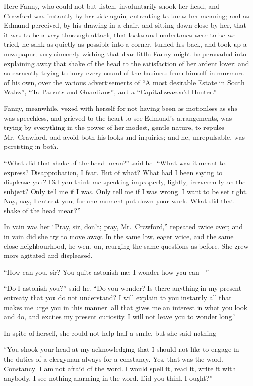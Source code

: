 Here Fanny, who could not but listen, involuntarily shook
her head, and Crawford was instantly by her side again,
entreating to know her meaning; and as Edmund perceived,
by his drawing in a chair, and sitting down close by her,
that it was to be a very thorough attack, that looks
and undertones were to be well tried, he sank as quietly
as possible into a corner, turned his back, and took up
a newspaper, very sincerely wishing that dear little
Fanny might be persuaded into explaining away that shake
of the head to the satisfaction of her ardent lover;
and as earnestly trying to bury every sound of the business
from himself in murmurs of his own, over the various
advertisements of ``A most desirable Estate in South
Wales''; ``To Parents and Guardians''; and a ``Capital
season'd Hunter.''

Fanny, meanwhile, vexed with herself for not having been
as motionless as she was speechless, and grieved to the heart
to see Edmund's arrangements, was trying by everything
in the power of her modest, gentle nature, to repulse
Mr.\ Crawford, and avoid both his looks and inquiries;
and he, unrepulsable, was persisting in both.

``What did that shake of the head mean?'' said he.  ``What was
it meant to express?  Disapprobation, I fear.  But of what?
What had I been saying to displease you?  Did you think me
speaking improperly, lightly, irreverently on the subject?
Only tell me if I was.  Only tell me if I was wrong.
I want to be set right.  Nay, nay, I entreat you;
for one moment put down your work.  What did that shake
of the head mean?''

In vain was her ``Pray, sir, don't; pray, Mr.\ Crawford,''
repeated twice over; and in vain did she try to move away.
In the same low, eager voice, and the same close neighbourhood,
he went on, reurging the same questions as before.
She grew more agitated and displeased.

``How can you, sir?  You quite astonish me; I wonder
how you can---''

``Do I astonish you?'' said he.  ``Do you wonder?  Is there
anything in my present entreaty that you do not understand?
I will explain to you instantly all that makes me urge
you in this manner, all that gives me an interest in
what you look and do, and excites my present curiosity.
I will not leave you to wonder long.''

In spite of herself, she could not help half a smile,
but she said nothing.

``You shook your head at my acknowledging that I should
not like to engage in the duties of a clergyman always
for a constancy.  Yes, that was the word.  Constancy:  I am
not afraid of the word.  I would spell it, read it,
write it with anybody.  I see nothing alarming in the word.
Did you think I ought?''


